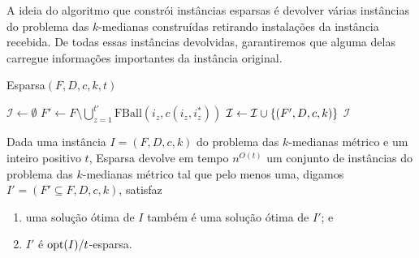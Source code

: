 A ideia do algoritmo que constrói instâncias esparsas é devolver várias instâncias do problema das $k$-medianas construídas retirando instalações da instância recebida. De todas essas instâncias devolvidas, garantiremos que alguma delas carregue informações importantes da instância original.

\begin{algorithm}
    \caption{\sc Esparsa$(F,D,c,k,t)$}
    \begin{algorithmic}[1]
        \State $\mathcal{I} \gets \emptyset$
        \State $F' \gets F\setminus \bigcup_{z=1}^{t'} \text{FBall}(i_z,c(i_z,i_z^*))$
        \State $\mathcal{I} \gets \mathcal{I} \cup \{(F',D,c,k)\}$
        \EndFor
        \State \Return $\mathcal{I}$
    \end{algorithmic}
\end{algorithm}

\begin{lemma} \label{lemma:5.3}
    Dada uma instância $I = (F,D,c,k)$ do problema das $k$-medianas métrico e um inteiro positivo $t$, {\sc Esparsa} devolve em tempo $n^{O(t)}$ um conjunto de instâncias do problema das $k$-medianas métrico tal que pelo menos uma, digamos ${I' = (F' \subseteq F,D,c,k)}$, satisfaz
    \begin{enumerate}
        \item uma solução ótima de $I$ também é uma solução ótima de $I'$; e
        \item $I'$ é $\mathrm{opt}(I)/t$-esparsa.
    \end{enumerate}
\end{lemma}

